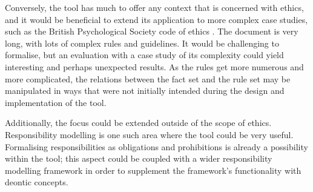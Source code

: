 \documentclass{l4proj}
\begin{document}
Conversely, the tool has much to offer any context that is concerned with ethics, and it would be beneficial to extend its application to more complex case studies, such as the British Psychological Society code of ethics \cite{bps_2016}. The document is very long, with lots of complex rules and guidelines. It would be challenging to formalise, but an evaluation with a case study of its complexity could yield interesting and perhaps unexpected results. As the rules get more numerous and more complicated, the relations between the fact set and the rule set may be manipulated in ways that were not initially intended during the design and implementation of the tool. 

Additionally, the focus could be extended outside of the scope of ethics. Responsibility modelling is one such area where the tool could be very useful. Formalising responsibilities as obligations and prohibitions is already a possibility within the tool; this aspect could be coupled with a wider responsibility modelling framework in order to supplement the framework's functionality with deontic concepts. 
\end{document}
